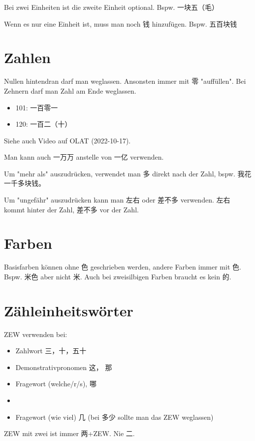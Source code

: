 \documentclass[UTF8]{ctexart}
\begin{document}
Bei zwei Einheiten ist die zweite Einheit optional. Bspw. 一块五（毛）

Wenn es nur eine Einheit ist, muss man noch 钱 hinzufügen. Bspw. 五百块钱

\section{Zahlen}

Nullen hintendran darf man weglassen. Ansonsten immer mit 零 "auffüllen". Bei Zehnern darf man Zahl am Ende weglassen.

\begin{itemize}
    \item 101: 一百零一
    \item 120: 一百二（十）
\end{itemize}

Siehe auch Video auf OLAT (2022-10-17).

Man kann auch 一万万 anstelle von 一亿 verwenden.

Um "mehr als" auszudrücken, verwendet man 多 direkt nach der Zahl, bspw. 我花一千多块钱。

Um "ungefähr" auszudrücken kann man 左右 oder 差不多 verwenden. 左右 kommt hinter der Zahl, 差不多 vor der Zahl.

\section{Farben}

Basisfarben können ohne 色 geschrieben werden, andere Farben immer mit 色. Bspw. 米色 aber nicht 米. Auch bei zweisilbigen Farben braucht es kein 的.

\section{Zähleinheitswörter}

ZEW verwenden bei:

\begin{itemize}
    \item Zahlwort 三，十，五十
    \item Demonstrativpronomen 这， 那
    \item Fragewort (welche/r/s), 哪    \item 
    \item Fragewort (wie viel) 几 (bei 多少 sollte man das ZEW weglassen)
\end{itemize}

ZEW mit zwei ist immer 两+ZEW. Nie 二.
\end{document}
